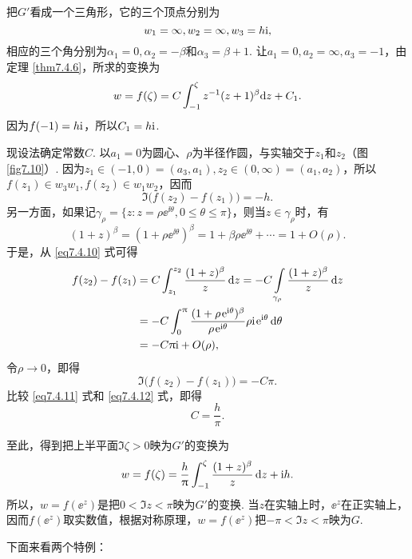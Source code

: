 \begin{solution}
把$G'$看成一个三角形，它的三个顶点分别为
\[w_1=\infty,w_2=\infty,w_3=h\textrm i,\]
相应的三个角分别为$\alpha_1=0,\alpha_2=-\beta$和$\alpha_3=\beta+1$. 让$a_1=0,a_2=\infty,a_3=-1$，由定理 \ref{thm7.4.6}，所求的变换为
\begin{equation}\label{eq7.4.10}
w=f(\zeta)=C\int_{-1}^\zeta z^{-1}(z+1)^\beta\textrm dz+C_1.
\end{equation}
因为$f(-1)=h\textrm i$，所以$C_1=h\textrm i$.

现设法确定常数$C$. 以$a_1=0$为圆心、$\rho$为半径作圆，与实轴交于$z_1$和$z_2$（图 \ref{fig7.10}）. 因为$z_1\in(-1,0)=(a_3,a_1),z_2\in(0,\infty)=(a_1,a_2)$，所以$f(z_1)\in w_3w_1,f(z_2)\in w_1w_2$，因而
\begin{equation}\label{eq7.4.11}
\Im\big(f(z_2)-f(z_1)\big)=-h.
\end{equation}
另一方面，如果记$\gamma_\rho=\{z:z=\rho\ee^{\ii\theta},0\le\theta\le\pi\}$，则当$z\in\gamma_\rho$时，有
\[(1+z)^\beta=(1+\rho\ee^{\ii\theta})^\beta=1+\beta\rho\ee^{\ii\theta}+\cdots
=1+O(\rho).\]
于是，从 \eqref{eq7.4.10} 式可得
\begin{align*}
f(z_2)-f(z_1)&=C\int_{z_1}^{z_2}\frac{(1+z)^\beta}z\dz=-C\int\limits_{\gamma_\rho}
\frac{(1+z)^\beta}z\dz\\
&=-C\int_0^\pi\frac{(1+\rho\ee^{\ii\theta})^\beta}{\rho\ee^{\ii\theta}}
\rho\ii\ee^{\ii\theta}\textrm d\theta\\
&=-C\pi\ii+O(\rho),
\end{align*}
令$\rho\to0$，即得
\begin{equation}\label{eq7.4.12}
\Im\big(f(z_2)-f(z_1)\big)=-C\pi.
\end{equation}
比较 \eqref{eq7.4.11} 式和 \eqref{eq7.4.12} 式，即得
\[C=\frac h\pi.\]

至此，得到把上半平面$\Im\zeta>0$映为$G'$的变换为
\begin{equation}\label{eq7.4.13}
w=f(\zeta)=\frac h{\uppi}\int_{-1}^\zeta\frac{(1+z)^\beta}z\mathop{}\!\mathrm dz+\mathrm i h.
\end{equation}
所以，$w=f(\ee^z)$是把$0<\Im z<\pi$映为$G'$的变换. 当$z$在实轴上时，$\ee^z$在正实轴上，因而$f(\ee^z)$取实数值，根据对称原理，$w=f(\ee^z)$把$-\pi<\Im z<\pi$映为$G$.

下面来看两个特例：


\end{solution}
